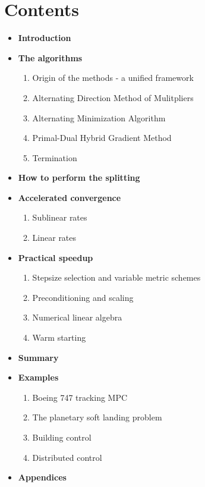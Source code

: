 \documentclass[paper=a4, fontsize=11pt]{scrartcl}
\begin{document}
\section{Contents}
\begin{itemize}
 \item \textbf{Introduction}
 \item \textbf{The algorithms}
       \begin{enumerate}
       \item Origin of the methods - a unified framework
       \item Alternating Direction Method of Mulitpliers
       \item Alternating Minimization Algorithm
       \item Primal-Dual Hybrid Gradient Method
       \item Termination
       \end{enumerate}
\item \textbf{How to perform the splitting}
\item \textbf{Accelerated convergence} 
       \begin{enumerate}
       \item Sublinear rates
       \item Linear rates
       \end{enumerate}  
\item \textbf{Practical speedup}
       \begin{enumerate}
       \item Stepsize selection and variable metric schemes
       \item Preconditioning and scaling
       \item Numerical linear algebra
       \item Warm starting
       \end{enumerate} 
\item \textbf{Summary}
\item \textbf{Examples}
       \begin{enumerate}
       \item Boeing 747 tracking MPC
       \item The planetary soft landing problem
       \item Building control
       \item Distributed control
       \end{enumerate}
\item \textbf{Appendices}
\end{itemize}
\end{document}
